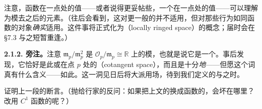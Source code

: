 注意，函数在一点处的值——或者说得更妥帖些，一个\trGerm{}在一点处的值——可以理解为\trLocalRing{}模去\trMaximalIdeal{}之后的元素。（往后会看到，这对更一般的\trSheaf{}并不适用，但对那些行为如同函数\trSheaf{}的对象\emph{确实}适用。这件事将正式化为\emph{\trLocallyRingedSpace{}}（locally ringed space）的概念；届时会在 \S7.3 与之短暂重逢。）

\textbf{2.1.2. 旁注。}\quad 注意 $\mathfrak{m}_p/\mathfrak{m}_p^2$ 是 $\mathscr{O}_p/\mathfrak{m}_p\cong\mathbb{R}$ 上的模，也就是说它是一个\trReal\trVectorSpace。事后发现，它恰好是此\trDifferentiable\trManifold{}或\trAnalytic\trManifold{}在点 $p$ 处的\trCotangentSpace（cotangent space），而且是十分\emph{\trNatural{}地}——但愿这个词真有什么含义——如此。这一洞见日后将大派用场，待到我们定义\trScheme{}的\trTangentSpace{}与\trCotangentSpace{}之时。
\begin{exercise}\label{ex:cotangent-space-proof}
证明上一段的断言。（抛给行家的反问：如果把上文的\trSheaf{}换成\trContinuous{}函数的\trSheaf，会坏在哪里？改用 $C^1$ 函数的\trSheaf{}呢？）
\end{exercise}
